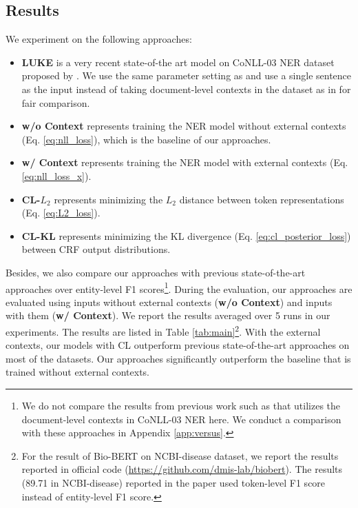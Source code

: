 \documentclass[11pt,a4paper]{article}
\begin{document}
\subsection{Results}
We experiment on the following approaches:
\begin{itemize}[leftmargin=*]
\item {\sc\textbf{LUKE}} is a very recent state-of-the art model on CoNLL-03 NER dataset proposed by \citet{yamada-etal-2020-luke}. We use the same parameter setting as \citet{yamada-etal-2020-luke} and use a single sentence as the input instead of taking document-level contexts in the dataset as in \citet{yamada-etal-2020-luke} for fair comparison.
    \item {\sc\textbf{w/o Context}} represents training the NER model without external contexts (Eq. \ref{eq:nll_loss}), which is the baseline of our approaches. 
    \item {\sc\textbf{w/ Context}} represents training the NER model with external contexts (Eq. \ref{eq:nll_loss_x}). 
    \item {\sc\textbf{CL-$L_2$}} represents minimizing the $L_2$ distance between token representations (Eq. \ref{eq:L2_loss}).
    \item {\sc\textbf{CL-KL}} represents minimizing the KL divergence (Eq. \ref{eq:cl_posterior_loss}) between CRF output distributions.
\end{itemize}
Besides, we also compare our approaches with previous state-of-the-art approaches over entity-level F1 scores\footnote{We do not compare the results from previous work such as \citet{yu-etal-2020-named,luoma-pyysalo-2020-exploring,yamada-etal-2020-luke} that utilizes the document-level contexts in CoNLL-03 NER here. We conduct a comparison with these approaches in Appendix \ref{app:versus}. }.
During the evaluation, our approaches are evaluated using inputs without external contexts ({\sc\textbf{w/o Context}}) and inputs with them ({\sc\textbf{w/ Context}}). We report the results averaged over 5 runs in our experiments. The results are listed in Table \ref{tab:main}\footnote{For the result of Bio-BERT \citep{lee2020biobert} on NCBI-disease dataset, we report the results reported in official code (\url{https://github.com/dmis-lab/biobert}). The results (89.71 in NCBI-disease) reported in the paper used token-level F1 score instead of entity-level F1 score.}. With the external contexts, our models with CL outperform previous state-of-the-art approaches on most of the datasets. Our approaches significantly outperform the baseline that is trained without external contexts. 
\end{document}
